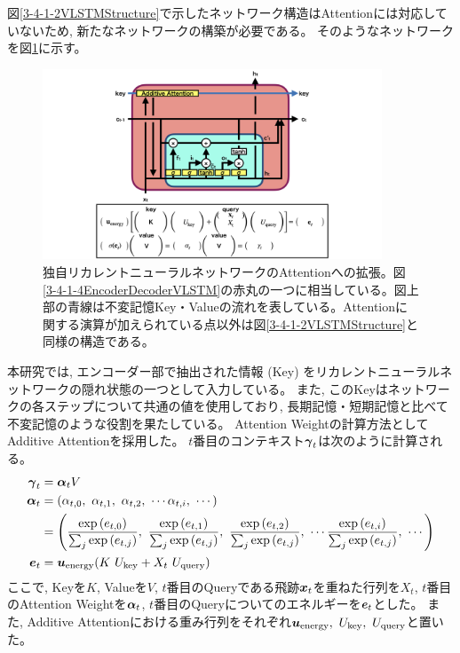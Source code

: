 図\ref{3-4-1-2VLSTMStructure}で示したネットワーク構造はAttentionには対応していないため, 新たなネットワークの構築が必要である。
そのようなネットワークを図\ref{3-4-1-5AttentionVLSTM}に示す。

\begin{figure}[htbp]
 \centering
 \includegraphics[trim = 100 0 100 0, width=0.9\textwidth, clip]{Figure/3Networks/3-4-1-5AttentionVLSTM.png}
 \caption[独自リカレントニューラルネットワークのAttentionへの拡張]{独自リカレントニューラルネットワークのAttentionへの拡張。図\ref{3-4-1-4EncoderDecoderVLSTM}の赤丸の一つに相当している。図上部の青線は不変記憶Key・Valueの流れを表している。Attentionに関する演算が加えられている点以外は図\ref{3-4-1-2VLSTMStructure}と同様の構造である。}
 \label{3-4-1-5AttentionVLSTM}
\end{figure}

本研究では, エンコーダー部で抽出された情報 (Key) をリカレントニューラルネットワークの隠れ状態の一つとして入力している。
また, このKeyはネットワークの各ステップについて共通の値を使用しており, 長期記憶・短期記憶と比べて不変記憶のような役割を果たしている。
Attention Weightの計算方法としてAdditive Attentionを採用した。
$t$番目のコンテキスト${\mbox{\boldmath{$\gamma$}}}_{t}$は次のように計算される。
\begin{equation}
 \begin{split}
  {\mbox{\boldmath{$\gamma$}}}_{t} 
  &= {\mbox{\boldmath{$\alpha$}}}_{t} V\\
  {\mbox{\boldmath{$\alpha$}}}_{t}
  &= (\alpha_{t,0},\ \alpha_{t,1},\ \alpha_{t,2},\ \cdots \alpha_{t,i},\ \cdots) \\
  &= \left(\frac{\exp{({{e}}_{t,0})}}{\sum_j \exp{({{e}}_{t,j})}},\ \frac{\exp{({{e}}_{t,1})}}{\sum_j \exp{({{e}}_{t,j})}},\ \frac{\exp{({{e}}_{t,2})}}{\sum_j \exp{({{e}}_{t,j})}},\  \cdots \frac{\exp{({{e}}_{t,i})}}{\sum_j \exp{({{e}}_{t,j})}},\ \cdots\right)\\
  {\mbox{\boldmath{$e$}}}_{t}
  &={\mbox{\boldmath{$u$}}}_{\rm energy} (K\ U_{\rm key} + X_t\ U_{\rm query}) \\
 \end{split}
\end{equation}
ここで, Keyを$K$, Valueを$V$, $t$番目のQueryである飛跡${\mbox{\boldmath{$x$}}}_{t}$を重ねた行列を$X_t$, $t$番目のAttention Weightを${\mbox{\boldmath{$\alpha$}}}_{t}$, $t$番目のQueryについてのエネルギーを${\mbox{\boldmath{$e$}}}_{t}$とした。
また, Additive Attentionにおける重み行列をそれぞれ${\mbox{\boldmath{$u$}}}_{\rm energy},\  U_{\rm key},\ U_{\rm query}$と置いた。

